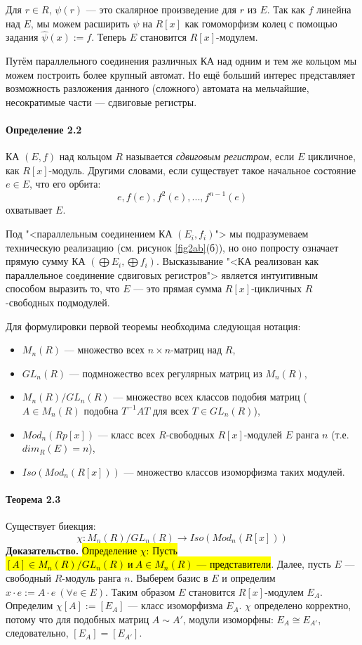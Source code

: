 \documentclass[a4paper,12pt]{article}
\begin{document}
Для $r \in R$, $\psi(r)$ --- это скалярное произведение для $r$ из $E$. Так как $f$ линейна над $E$, мы можем расширить $\psi$ на $R[x]$ как гомоморфизм колец с помощью задания $\hat{\psi}(x) := f$. Теперь $E$ становится $R[x]$-модулем.

Путём параллельного соединения различных КА над одним и тем же кольцом мы можем построить более крупный автомат. Но ещё больший интерес представляет возможность разложения данного (сложного) автомата на мельчайшие, несократимые части --- сдвиговые регистры.

\paragraph{Определение 2.2}
КА $(E,f)$ над кольцом $R$ называется \textit{сдвиговым регистром}, если $E$ цикличное, как $R[x]$-модуль. Другими словами, если существует такое начальное состояние $e \in E$, что его орбита:
$$
e, f(e), f^2(e), ..., f^{n-1}(e)
$$
охватывает $E$.

Под "<параллельным соединением КА $(E_i, f_i)$"> мы подразумеваем техническую реализацию (см. рисунок \ref{fig2ab}(б)), но оно попросту означает прямую сумму КА $(\bigoplus{E_i}, \bigoplus{f_i})$. Высказывание "<КА реализован как параллельное соединение сдвиговых регистров"> является интуитивным способом выразить то, что $E$ --- это прямая сумма $R[x]$-цикличных $R$-свободных подмодулей.

Для формулировки первой теоремы необходима следующая нотация:

\begin{itemize}
	\item $M_n(R)$ --- множество всех $n \times n$-матриц над $R$,
	\item $GL_n(R)$ --- подмножество всех регулярных матриц из $M_n(R)$,
	\item $M_n(R)/GL_n(R)$ --- множество всех классов подобия матриц ($A \in M_n(R)$ подобна $T^{-1}AT$ для всех $T \in GL_n(R)$),
	\item $Mod_n(Rp[x])$ --- класс всех $R$-свободных $R[x]$-модулей $E$ ранга $n$ (т.е. $dim_R(E) = n$),
	\item $Iso(Mod_n(R[x]))$ --- множество классов изоморфизма таких модулей.
\end{itemize}


\paragraph{Теорема 2.3} Существует биекция:
$$
\chi : M_n(R)/GL_n(R) \rightarrow Iso(Mod_n(R[x]))
$$
\textbf{Доказательство.}
\hl{Определение $\chi$: Пусть $[A] \in M_n(R)/GL_n(R) ~ и ~ A \in M_n(R)$ --- представители}.
Далее, пусть $E$ --- свободный $R$-модуль ранга $n$. Выберем базис в $E$ и определим $x \cdot e := A \cdot e ~ (\forall e \in E)$. Таким образом $E$ становится $R[x]$-модулем $E_A$. Определим $\chi [A] := [E_A]$ --- класс изоморфизма $E_A$. $\chi$ определено корректно, потому что для подобных матриц $A \sim A'$, модули изоморфны: $E_A \cong E_{A'}$, следовательно, $[E_A] = [E_{A'}]$.
\end{document}
